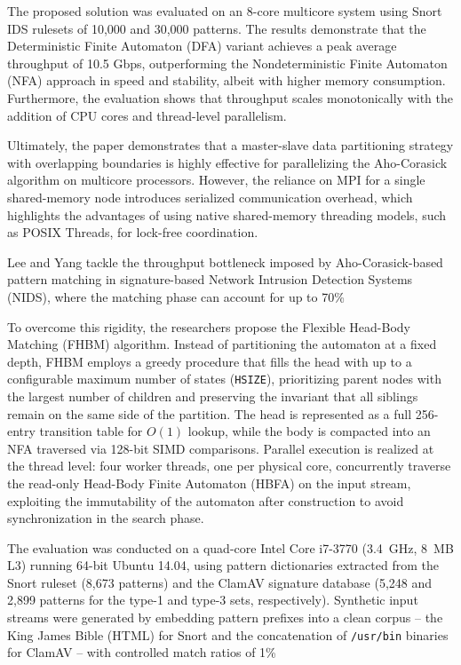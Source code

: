 The proposed solution was evaluated on an 8-core multicore system using Snort IDS rulesets of 10,000 and 30,000 patterns. The results demonstrate that the Deterministic Finite Automaton (DFA) variant achieves a peak average throughput of 10.5 Gbps, outperforming the Nondeterministic Finite Automaton (NFA) approach in speed and stability, albeit with higher memory consumption. Furthermore, the evaluation shows that throughput scales monotonically with the addition of CPU cores and thread-level parallelism.

Ultimately, the paper demonstrates that a master-slave data partitioning strategy with overlapping boundaries is highly effective for parallelizing the Aho-Corasick algorithm on multicore processors. However, the reliance on MPI for a single shared-memory node introduces serialized communication overhead, which highlights the advantages of using native shared-memory threading models, such as POSIX Threads, for lock-free coordination.


Lee and Yang \cite{LeeYang2017FHBM} tackle the throughput bottleneck imposed by Aho-Corasick-based pattern matching in signature-based Network Intrusion Detection Systems (NIDS), where the matching phase can account for up to 70\%

To overcome this rigidity, the researchers propose the Flexible Head-Body Matching (FHBM) algorithm. Instead of partitioning the automaton at a fixed depth, FHBM employs a greedy procedure that fills the head with up to a configurable maximum number of states (\texttt{HSIZE}), prioritizing parent nodes with the largest number of children and preserving the invariant that all siblings remain on the same side of the partition. The head is represented as a full 256-entry transition table for $O(1)$ lookup, while the body is compacted into an NFA traversed via 128-bit SIMD comparisons. Parallel execution is realized at the thread level: four worker threads, one per physical core, concurrently traverse the read-only Head-Body Finite Automaton (HBFA) on the input stream, exploiting the immutability of the automaton after construction to avoid synchronization in the search phase.

The evaluation was conducted on a quad-core Intel Core i7-3770 (3.4~GHz, 8~MB L3) running 64-bit Ubuntu 14.04, using pattern dictionaries extracted from the Snort ruleset (8{,}673 patterns) and the ClamAV signature database (5{,}248 and 2{,}899 patterns for the type-1 and type-3 sets, respectively). Synthetic input streams were generated by embedding pattern prefixes into a clean corpus -- the King James Bible (HTML) for Snort and the concatenation of \texttt{/usr/bin} binaries for ClamAV -- with controlled match ratios of 1\%

